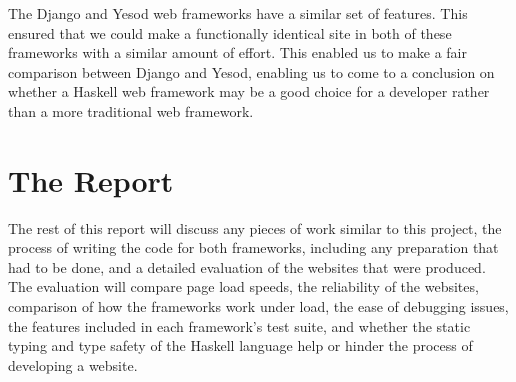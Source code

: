 The Django and Yesod web frameworks have a similar set of features. This ensured that we could
make a functionally identical site in both of these frameworks with a similar 
amount of effort. This enabled us to make a fair comparison between Django and Yesod, enabling
us to come to a conclusion on whether a Haskell web framework may be a good choice for a 
developer rather than a more traditional web framework.

\section{The Report}

The rest of this report will discuss any pieces of work similar to this project, the process of
writing the code for both frameworks, including any preparation that had to be done, and a detailed
evaluation of the websites that were produced. The evaluation will compare page load speeds,
the reliability of the websites, comparison of how the frameworks work under load, the ease of
debugging issues, the features included in each framework's test suite, and whether the static typing
and type safety of the Haskell language help or hinder the process of developing a website.
